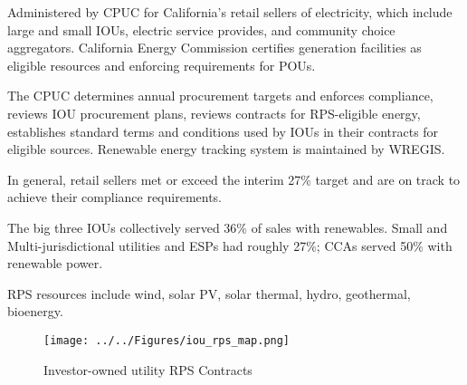 \documentclass[11pt, oneside]{article}   	%
\begin{document}
Administered by CPUC for California's retail sellers of electricity, which include large and small IOUs, electric service provides, and community choice aggregators.  California Energy Commission certifies generation facilities as eligible resources and enforcing requirements for POUs.  

The CPUC determines annual procurement targets and enforces compliance, reviews IOU procurement plans, reviews contracts for RPS-eligible energy, establishes standard terms and conditions used by IOUs in their contracts for eligible sources.  Renewable energy tracking system is maintained by WREGIS.  

In general, retail sellers met or exceed the interim 27\% target and are on track to achieve their compliance requirements. 

The big three IOUs collectively served 36\% of sales with renewables.  Small and Multi-jurisdictional utilities and ESPs had roughly 27\%; CCAs served 50\% with renewable power.  

RPS resources include wind, solar PV, solar thermal, hydro, geothermal, bioenergy.  
\begin{figure}
\caption{Investor-owned utility RPS Contracts}
\texttt{[image: ../../Figures/iou\_rps\_map.png]}
\end{figure}
\end{document}
